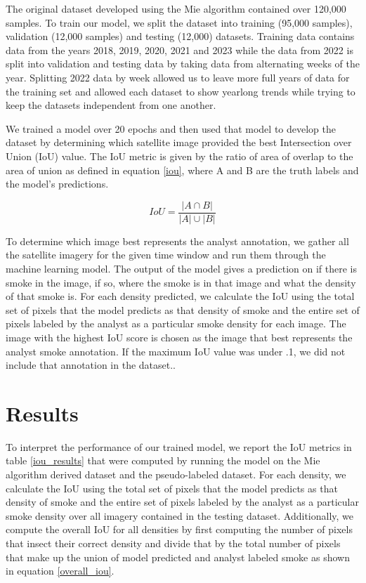 \documentclass{ametsocV6.1}
\begin{document}
The original dataset developed using the Mie algorithm contained over 120,000 samples. To train our model, we split the dataset into training (95,000 samples), validation (12,000 samples) and testing (12,000) datasets. Training data contains data from the years 2018, 2019, 2020, 2021 and 2023 while the data from 2022 is split into validation and testing data by taking data from alternating weeks of the year. Splitting 2022 data by week allowed us to leave more full years of data for the training set and allowed each dataset to show yearlong trends while trying to keep the datasets independent from one another.

We trained a model over 20 epochs and then used that model to develop the dataset by determining which satellite image provided the best Intersection over Union (IoU) value. The IoU metric is given by the ratio of area of overlap to the area of union as defined in equation \ref{iou}, where A and B are the truth labels and the model's predictions.

\begin{equation} \label{iou}
    IoU = \frac{| A \cap B|}{|A|\cup|B|}
\end{equation}

To determine which image best represents the analyst annotation, we gather all the satellite imagery for the given time window and run them through the machine learning model. The output of the model gives a prediction on if there is smoke in the image, if so, where the smoke is in that image and what the density of that smoke is. For each density predicted, we calculate the IoU using the total set of pixels that the model predicts as that density of smoke and the entire set of pixels labeled by the analyst as a particular smoke density for each image. The image with the highest IoU score is chosen as the image that best represents the analyst smoke annotation. If the maximum IoU value was under .1, we did not include that annotation in the dataset.. 



\section*{Results}

To interpret the performance of our trained model, we report the IoU metrics in table \ref{iou_results} that were computed by running the model on the Mie algorithm derived dataset and the pseudo-labeled dataset. For each density, we calculate the IoU using the total set of pixels that the model predicts as that density of smoke and the entire set of pixels labeled by the analyst as a particular smoke density over all imagery contained in the testing dataset. Additionally, we compute the overall IoU for all densities by first computing the number of pixels that insect their correct density and divide that by the total number of pixels that make up the union of model predicted and analyst labeled smoke as shown in equation \ref{overall_iou}.
\end{document}
